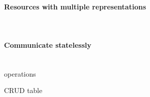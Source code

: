 \paragraph{Resources with multiple representations} ~\\
\paragraph{Communicate statelessly} ~\\


operations


CRUD table


